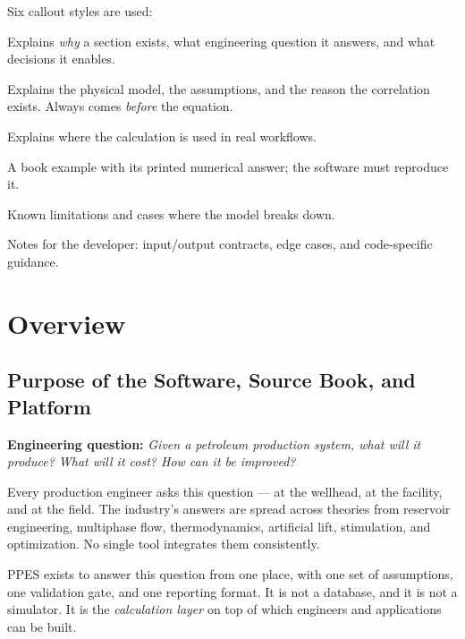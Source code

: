 \documentclass[11pt,a4paper,openany]{book}
\begin{document}
Six callout styles are used:

\begin{purpose}
Explains \emph{why} a section exists, what engineering question it
answers, and what decisions it enables.
\end{purpose}

\begin{theory}
Explains the physical model, the assumptions, and the reason the
correlation exists. Always comes \emph{before} the equation.
\end{theory}

\begin{application}
Explains where the calculation is used in real workflows.
\end{application}

\begin{valbox}
A book example with its printed numerical answer; the software must
reproduce it.
\end{valbox}

\begin{warnbox}
Known limitations and cases where the model breaks down.
\end{warnbox}

\begin{implbox}
Notes for the developer: input/output contracts, edge cases, and
code-specific guidance.
\end{implbox}

\tableofcontents
\listoflistings
\listoftables

\mainmatter

\part{Overview}

\chapter{Purpose of the Software, Source Book, and Platform}

\begin{purpose}
\textbf{Engineering question:} \emph{Given a petroleum production
system, what will it produce? What will it cost? How can it be
improved?}

Every production engineer asks this question — at the wellhead, at the
facility, and at the field. The industry's answers are spread across
theories from reservoir engineering, multiphase flow, thermodynamics,
artificial lift, stimulation, and optimization. No single tool
integrates them consistently.

PPES exists to answer this question from one place, with one set of
assumptions, one validation gate, and one reporting format. It is not
a database, and it is not a simulator. It is the \emph{calculation
layer} on top of which engineers and applications can be built.
\end{purpose}
\end{document}
